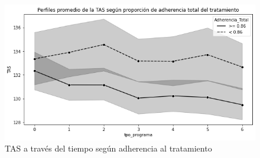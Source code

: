 \documentclass[spanish]{article}
\numberwithin{figure}{subsection}
\numberwithin{equation}{subsection}
\numberwithin{table}{subsection}
\begin{document}
\begin{figure}[H]
	\centering
	\includegraphics[scale=0.5]{img/TAS_vs_tpo_with_adherencia.png}
	\caption{TAS a través del tiempo según adherencia al tratamiento}
	\label{TAS_with_adh}
\end{figure}


\newpage
\nocite{*}
\renewcommand{\refname}{Bibliografía}

\end{document}
